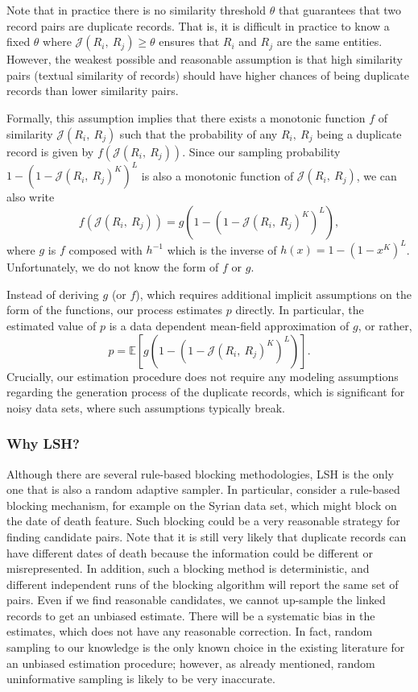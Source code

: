 \documentclass{imsart}
\begin{document}
Note that in practice there is no similarity threshold $\theta$ that guarantees that two record pairs are duplicate records. That is, it is difficult in practice to know a fixed $\theta$ where $\mathcal{J}(R_i,\ R_j) \ge \theta$ ensures that $R_i$ and $R_j$ are the same entities. However, the weakest possible and reasonable assumption is that high similarity pairs (textual similarity of records) should have higher chances of being duplicate records than lower similarity pairs.

Formally, this assumption implies that there exists a monotonic function $f$ of similarity $\mathcal{J}(R_i,\ R_j)$ such that the probability of any $R_i, \ R_j$ being a duplicate record is given by $f(\mathcal{J}(R_i,\ R_j))$.  Since our sampling probability $1-(1-\mathcal{J}(R_i,\ R_j)^K)^L$ is also a monotonic function of $\mathcal{J}(R_i,\ R_j)$, we can also write $$f(\mathcal{J}(R_i,\ R_j)) = g(1-(1-\mathcal{J}(R_i,\ R_j)^K)^L),$$ where $g$ is $f$ composed with $h^{-1}$ which is the inverse of $h(x) = 1-(1-x^K)^L$. Unfortunately, we do not know the form of $f$ or $g$.

Instead of deriving $g$ (or $f$), which requires additional implicit assumptions on the form of the functions, our process estimates $p$ directly. In particular, the estimated value of $p$ is a data dependent mean-field approximation of $g$, or  rather, $$p = \mathbb{E}[g(1-(1-\mathcal{J}(R_i,\ R_j)^K)^L)].$$ Crucially, our estimation procedure does not require any modeling assumptions regarding the generation process of the duplicate records, which is significant for noisy data sets, where such assumptions typically break.


\subsubsection{Why LSH?}
\label{sec:WHYLSH}
Although there are several rule-based blocking methodologies, LSH is the only one that is also a random adaptive sampler. In particular, consider a rule-based blocking mechanism, for example on the Syrian data set, which might block on the date of death feature. Such blocking could be a very reasonable strategy for finding candidate pairs. Note that it is still very likely that duplicate records can have different dates of death because the information could be different or misrepresented.  In addition, such a blocking method is deterministic, and different independent runs of the blocking algorithm will report the same set of pairs. Even if we find reasonable candidates, we cannot up-sample the linked records to get an unbiased estimate. There will be a systematic bias in the estimates, which does not have any reasonable correction. In fact, random sampling to our knowledge is the only known choice in the existing literature for an unbiased estimation procedure; however, as already mentioned, random uninformative sampling is likely to be very inaccurate.
\end{document}
